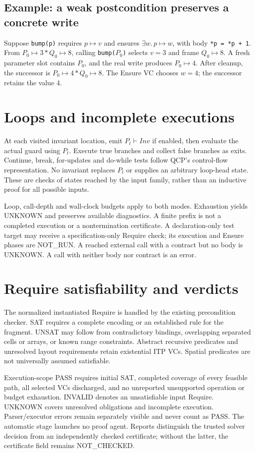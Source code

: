 \documentclass[10pt]{article}
\begin{document}
\subsection{Example: a weak postcondition preserves a concrete write}
Suppose \texttt{bump(p)} requires $p\mapsto v$ and ensures
$\exists w.\,p\mapsto w$, with body \texttt{*p = *p + 1}.
From $P_0\mapsto3 * Q_0\mapsto8$, calling \texttt{bump($P_0$)}
selects $v=3$ and frame $Q_0\mapsto8$. A fresh parameter slot contains
$P_0$, and the real write produces $P_0\mapsto4$. After cleanup, the successor
is $P_0\mapsto4 * Q_0\mapsto8$. The Ensure VC chooses $w=4$; the successor
retains the value 4.

\section{Loops and incomplete executions}
At each visited invariant location, emit $P_t\vdash\mathit{Inv}$ if enabled,
then evaluate the actual guard using $P_t$. Execute true branches and collect
false branches as exits. Continue, break, for-updates and do-while tests follow
QCP's control-flow representation. No invariant replaces $P_t$ or supplies an
arbitrary loop-head state. These are checks of states reached by the input
family, rather than an inductive proof for all possible inputs.

Loop, call-depth and wall-clock budgets apply to both modes. Exhaustion yields
UNKNOWN and preserves available diagnostics. A finite prefix is not a
completed execution or a nontermination certificate. A declaration-only test
target may receive a specification-only Require check; its execution and
Ensure phases are NOT\_RUN. A reached external call with a contract but no
body is UNKNOWN. A call with neither body nor contract is an error.

\section{Require satisfiability and verdicts}
The normalized instantiated Require is handled by the existing precondition
checker. SAT requires a complete encoding or an established rule for the
fragment. UNSAT may follow from contradictory bindings, overlapping separated
cells or arrays, or known range constraints. Abstract recursive predicates
and unresolved layout requirements retain existential ITP VCs. Spatial
predicates are not universally assumed satisfiable.

Execution-scope PASS requires initial SAT, completed coverage of every
feasible path, all selected VCs discharged, and no unreported unsupported
operation or budget exhaustion. INVALID denotes an unsatisfiable input
Require. UNKNOWN covers unresolved obligations and incomplete execution.
Parser/executor errors remain separately visible and never count as PASS.
The automatic stage launches no proof agent. Reports distinguish the trusted
solver decision from an independently checked certificate; without the latter,
the certificate field remains NOT\_CHECKED.
\end{document}
